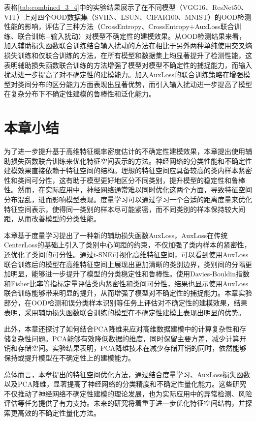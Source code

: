 表格\ref{tab:combined_3_4}中的实验结果展示了在不同模型（VGG16、ResNet50、VIT）上对四个OOD数据集（SVHN、LSUN、CIFAR100、MNIST）的OOD检测性能的影响，评估了三种方法（CrossEntropy、CrossEntropy+AuxLoss联合训练、联合训练+输入扰动）对模型不确定性的建模效果。从OOD检测结果来看，加入辅助损失函数联合训练结合输入扰动的方法在相比于另外两种单纯使用交叉熵损失训练和仅联合训练的方法，在所有模型和数据集上均显著提升了检测性能，这表明辅助损失函数联合训练的方法增强了模型对模型不确定性的捕捉能力，而输入扰动进一步提高了对不确定性的建模能力。加入AuxLoss的联合训练策略在增强模型对类间分布的区分能力方面表现出显著优势，而引入输入扰动进一步提高了模型在复杂分布下不确定性建模的鲁棒性和泛化能力。

\section{本章小结}
为了进一步提升基于高维特征概率密度估计的不确定性建模效果，本章提出使用辅助损失函数联合训练来优化特征空间表示的方法。神经网络的分类性能和不确定性建模效果直接依赖于特征空间的结构。理想的特征空间应具备较高的类内样本紧密性和类间可分性，这有助于模型更好地区分不同类别，提升模型的稳定性和鲁棒性。然而，在实际应用中，神经网络通常难以同时优化这两个方面，导致特征空间分布混乱，进而影响模型表现。度量学习可以通过学习一个合适的距离度量来优化特征空间表示，使得同一类别的样本尽可能紧密，而不同类别的样本保持较大间距，从而改善模型的分类性能。

本章基于度量学习提出了一种新的辅助损失函数AuxLoss，AuxLoss在传统CenterLoss的基础上引入了类别中心间距的约束，不仅加强了类内样本的紧密性，还优化了类间的可分性。通过t-SNE可视化高维特征空间，可以看到使用AuxLoss联合训练后的模型在高维特征空间上展现出更加清晰的类别边界，类别间的分隔更加明显，能够进一步提升了模型的分类稳定性和鲁棒性。使用Davies-Bouldin指数和Fisher比率等指标定量评估类内紧密性和类间可分性，结果也显示使用AuxLoss联合训练能够带来明显的提升，从而增强了模型对不确定性的捕捉能力。本章实验部分，在OOD检测和误分类样本识别等任务上评估对不确定性的建模效果，结果表明，采用辅助损失函数联合训练的模型在不确定性建模上表现出明显的优势。

此外，本章还探讨了如何结合PCA降维来应对高维数据建模中的计算复杂性和存储复杂性问题。PCA能够有效降低数据的维度，同时保留主要方差，减少计算开销和存储空间。实验结果表明，PCA降维技术在减少存储开销的同时，依然能够保持或提升模型在不确定性上的建模能力。

总体而言，本章提出的特征空间优化方法，通过结合度量学习、AuxLoss损失函数以及PCA降维，显著提高了神经网络的分类精度和不确定性量化能力。这些研究不仅推动了神经网络不确定性建模的理论发展，也为实际应用中的异常检测、风险评估等任务提供了有力支持。未来的研究将着重于进一步优化特征空间结构，并探索更高效的不确定性量化方法。
